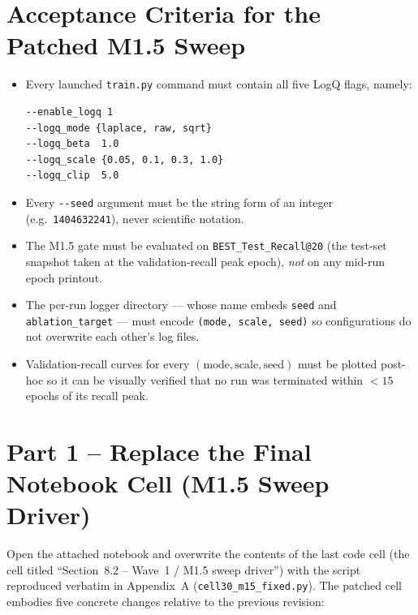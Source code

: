 \documentclass[11pt, a4paper]{article}
\begin{document}
\section{Acceptance Criteria for the Patched M1.5 Sweep}
\begin{itemize}[leftmargin=*,itemsep=3pt]
  \item Every launched \texttt{train.py} command must contain all five LogQ
        flags, namely:
\begin{lstlisting}[style=py,language=bash,numbers=none]
--enable_logq 1
--logq_mode {laplace, raw, sqrt}
--logq_beta  1.0
--logq_scale {0.05, 0.1, 0.3, 1.0}
--logq_clip  5.0
\end{lstlisting}
  \item Every \texttt{-{}-seed} argument must be the string form of an integer
        (e.g.\ \texttt{1404632241}), never scientific notation.
  \item The M1.5 gate must be evaluated on \texttt{BEST\_Test\_Recall@20}
        (the test-set snapshot taken at the validation-recall peak epoch),
        \emph{not} on any mid-run epoch printout.
  \item The per-run logger directory --- whose name embeds
        \texttt{seed} and \texttt{ablation\_target} --- must encode
        \texttt{(mode, scale, seed)} so configurations do not overwrite each
        other's log files.
  \item Validation-recall curves for every $(\text{mode}, \text{scale},
        \text{seed})$ must be plotted post-hoc so it can be visually verified
        that no run was terminated within $<15$ epochs of its recall peak.
\end{itemize}

\section{Part 1 -- Replace the Final Notebook Cell (M1.5 Sweep Driver)}
Open the attached notebook and overwrite the contents of the last code cell
(the cell titled ``Section~8.2 -- Wave~1 / M1.5 sweep driver'') with the
script reproduced verbatim in Appendix~A
(\texttt{cell30\_m15\_fixed.py}). The patched cell embodies five concrete
changes relative to the previous revision:
\end{document}
